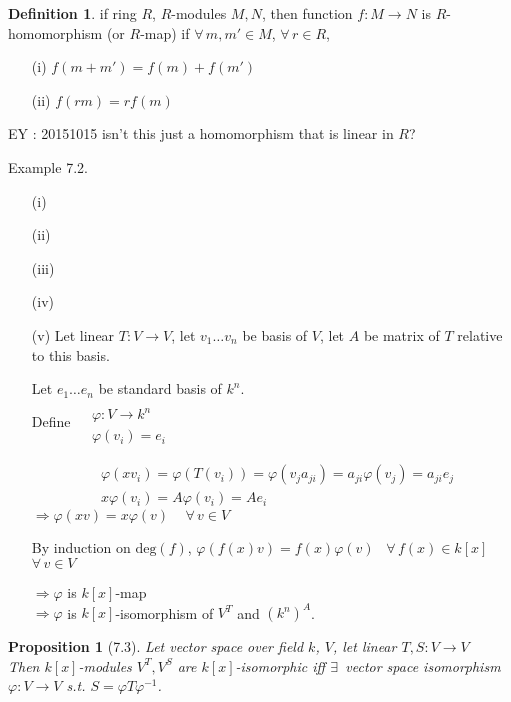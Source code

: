 \documentclass[twoside,landscape]{amsart}
\theoremstyle{plain}
\newtheorem{proposition}{Proposition}
\theoremstyle{definition}
\newtheorem{definition}{Definition}
\theoremstyle{remark}
\begin{document}
\begin{multicols*}{2}
\begin{definition}
if ring $R$, $R$-modules $M,N$, then function $f:M\to N$ is $R$-homomorphism (or $R$-map) if $\forall \, m,m' \in M$, $\forall \, r \in R$, 
\begin{enumerate}
  \item[(i)] $f(m+m') = f(m)+f(m')$
  \item[(ii)] $f(rm)=rf(m)$
\end{enumerate}
\end{definition}
EY : 20151015 isn't this just a homomorphism that is linear in $R$? 

Example 7.2.  

\begin{enumerate}
  \item[(i)]
  \item[(ii)]
  \item[(iii)]
  \item[(iv)]
  \item[(v)] Let linear $T:V \to V$, let $v_1 \dots v_n$ be basis of $V$, let $A$ be matrix of $T$ relative to this basis.  

Let $e_1 \dots e_n$ be standard basis of $k^n$.  \\
Define $\begin{aligned} & \quad \\
  & \varphi : V \to k^n \\
  & \varphi(v_i) = e_i \end{aligned}$

\[
\begin{aligned}
  & \varphi(xv_i) = \varphi(T(v_i)) = \varphi(v_j a_{ji} ) = a_{ji} \varphi(v_j) = a_{ji}e_j \\
  & x\varphi(v_i) = A\varphi(v_i) = Ae_i
\end{aligned}
\]
$\Longrightarrow \varphi(xv) = x\varphi(v) \quad \, \forall \, v \in V$

By induction on $\text{deg}(f)$, $\varphi(f(x)v) = f(x) \varphi(v)$ \quad \, $\forall \, f(x) \in k[x]$ \quad \, $\forall \, v \in V$ 

$\Longrightarrow \varphi$ is $k[x]$-map \\
$\Longrightarrow \varphi$ is $k[x]$-isomorphism of $V^T$ and $(k^n)^A$.  

\end{enumerate}


\begin{proposition}[7.3]
Let vector space over field $k$, $V$, let linear $T,S : V \to V$ \\
Then $k[x]$-modules $V^T, V^S$ are $k[x]$-isomorphic iff $\exists \, $ vector space isomorphism $\varphi : V \to V$ s.t. $S = \varphi T \varphi^{-1}$.  
\end{proposition}


\end{multicols*}
\end{document}
